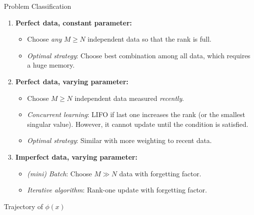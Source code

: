\documentclass[handout]{beamer}
\theoremstyle{plain}
\theoremstyle{definition}
\theoremstyle{remark}
\begin{document}
\begin{frame}{Problem Classification}
	\begin{enumerate}
		\item<+-> \textbf{Perfect data, constant parameter:}
			\begin{itemize} 
				\item Choose \textit{any} $M \ge N$ independent data so that the rank
					is full.
				\item \textit{Optimal strategy}: Choose \alert{best combination} among
					all data, which requires a huge memory.
			\end{itemize}
		\item<+-> \textbf{Perfect data, varying parameter:}
			\begin{itemize}
				\item Choose $M \ge N$ independent data measured \textit{recently}.
				\item \textit{Concurrent learning}: \alert{LIFO} if last one increases
					the rank (or the smallest singular value). \alert{However}, it cannot
					update until the condition is satisfied.
				\item \textit{Optimal strategy}: Similar with more weighting to recent
					data.
			\end{itemize}
		\item<+-> \textbf{Imperfect data, varying parameter:}
			\begin{itemize}
				\item \textit{(mini) Batch}: Choose \alert{$M \gg N$} data with
					forgetting factor.
				\item \textit{Iterative algorithm}: Rank-one update with
					forgetting factor. 
		\end{itemize}
	\end{enumerate}
\end{frame}

\begin{frame}{Trajectory of $\phi(x)$}
	\centering
\end{frame}
\end{document}
